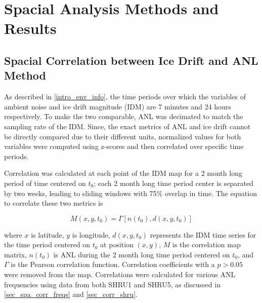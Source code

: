 \section{Spacial Analysis Methods and Results}


\subsection{Spacial Correlation between Ice Drift and ANL Method} \label{sec_corr_method}

As described in \autoref{intro_env_info}, the time periods over which the variables of ambient noise and ice drift magnitude (IDM) are 7 minutes and 24 hours respectively. To make the two comparable, ANL was decimated to match the sampling rate of the IDM. Since, the exact metrics of ANL and ice drift cannot be directly compared due to their different units, normalized values for both variables were computed using z-scores and then correlated over specific time periods. 

Correlation was calculated at each point of the IDM map for a 2 month long period of time centered on $t_{0}$; each 2 month long time period center is separated by two weeks, leading to sliding windows with 75\% overlap in time. \parencite{Bonnel2021} The equation to correlate these two metrics is 

\begin{equation}    \label{eq_spacialcorr}
    M(x,y,t_{0})=\Gamma [n(t_{0}),d(x,y,t_{0})]
\end{equation}
 
where $x$ is latitude, $y$ is longitude, $d(x,y,t_{0})$ represents the IDM time series for the time period centered on $t_0$ at position $(x,y)$, $M$ is the correlation map matrix, $n(t_0)$ is ANL during the 2 month long time period centered on $t_0$, and $\Gamma$ is the Pearson correlation function. Correlation coefficients with a $p>0.05$ were removed from the map. Correlations were calculated for various ANL frequencies using data from both SHRU1 and SHRU5, as discussed in \autoref{sec_spa_corr_freqs} and \autoref{sec_corr_shru}.%


